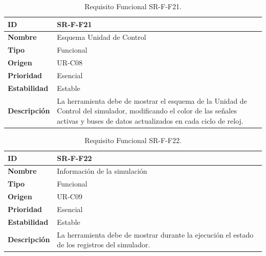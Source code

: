 \begin{center}
\begin{table}[htbp]
\centering
\begin{tabular}{@{}p{2.5cm} p{9cm}@{}} 
\toprule
\textbf{ID} 				& SR-F-F21 \\
\midrule
\textbf{Nombre} 			& Esquema Unidad de Control\\
\midrule
\textbf{Tipo} 			& Funcional \\
\midrule
\textbf{Origen} 			& UR-C08 \\
\midrule
\textbf{Prioridad}		& Esencial \\
\midrule
\textbf{Estabilidad} 		& Estable \\
\midrule
\textbf{Descripción} 	& La herramienta debe de mostrar el esquema de la Unidad de Control del simulador, modificando el color de las señales activas y buses de datos actualizados en cada ciclo de reloj. \\
\bottomrule
\end{tabular}
\caption{Requisito Funcional SR-F-F21.}
\label{tab:srff21}
\end{table}
\end{center}

\begin{center}
\begin{table}[htbp]
\centering
\begin{tabular}{@{}p{2.5cm} p{9cm}@{}} 
\toprule
\textbf{ID} 				& SR-F-F22\\
\midrule
\textbf{Nombre} 			& Información de la simulación\\
\midrule
\textbf{Tipo} 			& Funcional \\
\midrule
\textbf{Origen} 			& UR-C09 \\
\midrule
\textbf{Prioridad}		& Esencial \\
\midrule
\textbf{Estabilidad} 		& Estable \\
\midrule
\textbf{Descripción} 	& La herramienta debe de mostrar durante la ejecución el estado de los registros del simulador. \\
\bottomrule
\end{tabular}
\caption{Requisito Funcional SR-F-F22.}
\label{tab:srff22}
\end{table}
\end{center}





\iffalse

